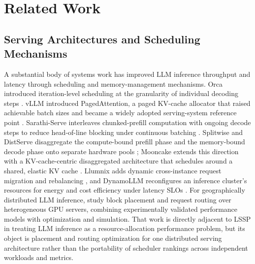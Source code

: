 \section{Related Work}
\label{sec:related-work}

\subsection{Serving Architectures and Scheduling Mechanisms}
\label{sec:related-serving}

A substantial body of systems work has improved LLM inference throughput and
latency through scheduling and memory-management mechanisms. Orca introduced
iteration-level scheduling at the granularity of individual decoding steps
\citep{yu2022orca}. vLLM introduced PagedAttention, a paged
KV-cache allocator that raised achievable batch sizes and became a widely
adopted serving-system reference point \citep{kwon2023vllm}. Sarathi-Serve
interleaves chunked-prefill computation with ongoing decode steps to reduce
head-of-line blocking under continuous batching \citep{agrawal2024sarathi}.
Splitwise and DistServe disaggregate the compute-bound prefill phase and the
memory-bound decode phase onto separate hardware pools
\citep{patel2024splitwise,zhong2024distserve}; Mooncake extends this
direction with a KV-cache-centric disaggregated architecture that schedules
around a shared, elastic KV cache \citep{qin2025mooncake}. Llumnix
adds dynamic cross-instance request migration and rebalancing
\citep{sun2024llumnix}, and DynamoLLM reconfigures an inference cluster's
resources for energy and cost efficiency under latency SLOs
\citep{stojkovic2025dynamollm}.
For geographically distributed LLM inference, \citet{sun2025geodistributed}
study block placement and request routing over heterogeneous GPU servers,
combining experimentally validated performance models with optimization
and simulation. That work is directly adjacent to LSSP in treating LLM
inference as a resource-allocation performance problem, but its object is
placement and routing optimization for one distributed serving
architecture rather than the portability of scheduler rankings across
independent workloads and metrics.

